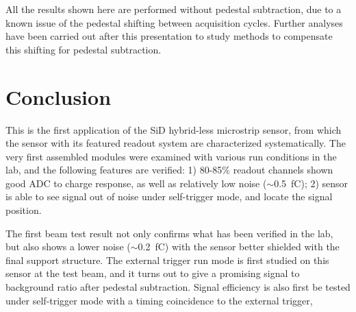 \documentclass[journal]{IEEEtran}
\def\lycoris{\textsc{Lycoris}\xspace}%
\begin{document}
All the results shown here are performed without pedestal subtraction, due to a known issue of the pedestal shifting between acquisition cycles.
Further analyses have been carried out after this presentation to study methods to compensate this shifting for pedestal subtraction.

\section{Conclusion}

This is the first application of the SiD hybrid-less microstrip sensor, from which the sensor with its featured readout system are characterized systematically.
The very first assembled modules were examined with various run conditions in the lab, and the following features are verified:
1) 80-85\% readout channels shown good ADC to charge response, as well as relatively low noise ($\sim$\SI{0.5}{fC});
2) sensor is able to see signal out of noise under self-trigger mode, and locate the signal position.

The first beam test result not only confirms what has been verified in the lab, but also shows a lower noise ($\sim$\SI{0.2}{fC}) with the sensor better shielded with the final support structure.
The external trigger run mode is first studied on this sensor at the test beam, %
and it turns out to give a promising signal to background ratio after pedestal subtraction.
Signal efficiency is also first be tested under self-trigger mode with a timing coincidence to the external trigger,



%
\end{document}
